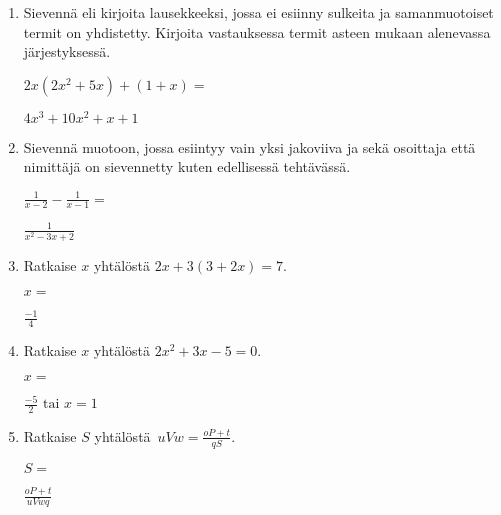 \documentclass[finnish, a4paper, 12pt]{article}
\begin{document}
\begin{enumerate}[leftmargin=*]
		\vspace{8pt}
		
		\item %
		Sievennä eli kirjoita lausekkeeksi, jossa ei esiinny sulkeita ja 
		samanmuotoiset termit on yhdistetty. 
		Kirjoita vastauksessa termit asteen mukaan alenevassa järjestyksessä. 
		
		\(
		\displaystyle
		2x(2x^2 + 5x) + (1 + x) = 
		\) %
		\begin{version:withAnswers}
		\( 4x^3 +10x^2 +x +1 \)
		\end{version:withAnswers}
		
		\vspace{8pt}
		
		\item %
		Sievennä %
		muotoon, jossa esiintyy vain yksi jakoviiva ja sekä osoittaja
		että nimittäjä on sievennetty kuten edellisessä tehtävässä.
		
		\(
		\displaystyle
		\frac{1}{x-2}- \frac{1}{x - 1} =
		\) %
		\begin{version:withAnswers}
		\( \frac{1}{x^2-3x+2} \)
		\end{version:withAnswers}
		
		\vspace{8pt}
		
		\item %
		Ratkaise \(x\) yhtälöstä \(2x + 3(3 + 2x) = 7\).
		
		\(
		x = 
		\)	%
		\begin{version:withAnswers}
		 \( \frac{-1}{4} \)
		\end{version:withAnswers}
		\vspace{8pt}
		
		\item %
		Ratkaise \(x\) yhtälöstä \(2x^2+3x-5= 0\).
		
		\(
		x = 		
		\)	%
		
		\begin{version:withAnswers}
		\(\frac{-5}{2} \text{  tai } x = 1\)
		\end{version:withAnswers}
		\vspace{8pt}
		
		\item %
		Ratkaise \(S\) yhtälöstä 
		\(
		\displaystyle \,
		uVw = \frac{oP+t}{qS} .
		\)	
		
		\(
		S = 
		\) %
		\begin{version:withAnswers}
		\( \frac{oP+t}{uVwq}\)
		\end{version:withAnswers}
		
	\end{enumerate}
	
	
\end{document}
